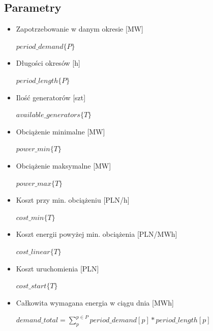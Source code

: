 \documentclass[12pt, twoside, hidelinks, a4paper]{article}
\begin{document}
\subsection{Parametry}
\begin{itemize}
\item Zapotrzebowanie w danym okresie [MW]

$period\_demand \{P\}$
\item Długości okresów [h]

$period\_length \{P\}$
\item Ilość generatorów [szt]

$available\_generators \{T\}$
\item Obciążenie minimalne [MW]

$power\_min \{T\}$
\item Obciążenie maksymalne [MW]

$power\_max \{T\}$ 
\item Koszt przy min. obciążeniu [PLN/h]

$cost\_min \{T\}$ 
\item Koszt energii powyżej min. obciążenia [PLN/MWh]

$cost\_linear \{T\}$ 
\item Koszt uruchomienia [PLN]

$cost\_start \{T\}$
\item Całkowita wymagana energia w ciągu dnia [MWh]

$demand\_total = \sum_{p}^{p \in P} period\_demand[p] * period\_length[p]$
\end{itemize}
\end{document}

